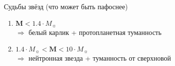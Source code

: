 \documentclass[usenames,dvipsnames,pdftex,unicode,hidelinks]{beamer}
\begin{document}
  \begin{frame}{Судьбы звёзд \small (что может быть пафоснее)}
    \begin{enumerate}
      \item<1-> $\boldsymbol{M} < 1.4 \cdot M_{\sun}$\\
        $\Rightarrow$ белый карлик {\small + протопланетная туманность}
        \begin{center}
        \end{center}
      \item<2-> $1.4 \cdot M_{\sun} < \boldsymbol{M} < 10 \cdot M_{\sun}$\\
        $\Rightarrow$ нейтронная звезда {\small + туманность от сверхновой}
        \begin{center}

\end{center}
\end{enumerate}
\end{frame}
\end{document}
